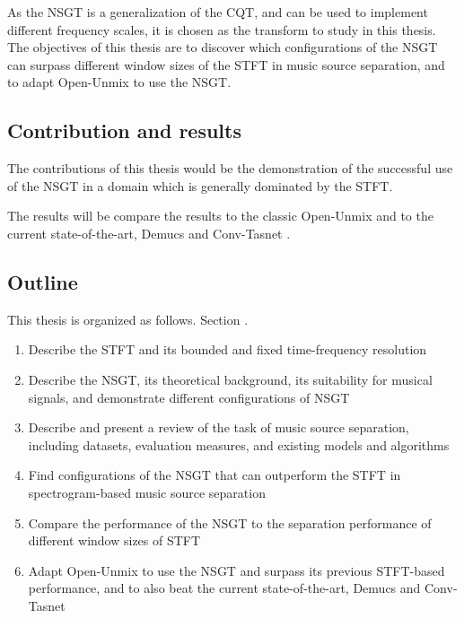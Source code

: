 \documentclass[report.tex]{subfiles}
\begin{document}
As the NSGT is a generalization of the CQT, and can be used to implement different frequency scales, it is chosen as the transform to study in this thesis. The objectives of this thesis are to discover which configurations of the NSGT can surpass different window sizes of the STFT in music source separation, and to adapt Open-Unmix to use the NSGT.

\subsection{Contribution and results}

The contributions of this thesis would be the demonstration of the successful use of the NSGT in a domain which is generally dominated by the STFT. 

The results will be compare the results to the classic Open-Unmix and to the current state-of-the-art, Demucs and Conv-Tasnet \cite{demucs}.

\subsection{Outline}

This thesis is organized as follows. Section .

\begin{enumerate}
	\item
		Describe the STFT and its bounded and fixed time-frequency resolution
	\item
		Describe the NSGT, its theoretical background, its suitability for musical signals, and demonstrate different configurations of NSGT
	\item
		Describe and present a review of the task of music source separation, including datasets, evaluation measures, and existing models and algorithms
	\item
		Find configurations of the NSGT that can outperform the STFT in spectrogram-based music source separation
	\item
		Compare the performance of the NSGT to the separation performance of different window sizes of STFT
	\item
		Adapt Open-Unmix to use the NSGT and surpass its previous STFT-based performance, and to also beat the current state-of-the-art, Demucs and Conv-Tasnet \cite{demucs}
\end{enumerate}
\end{document}
